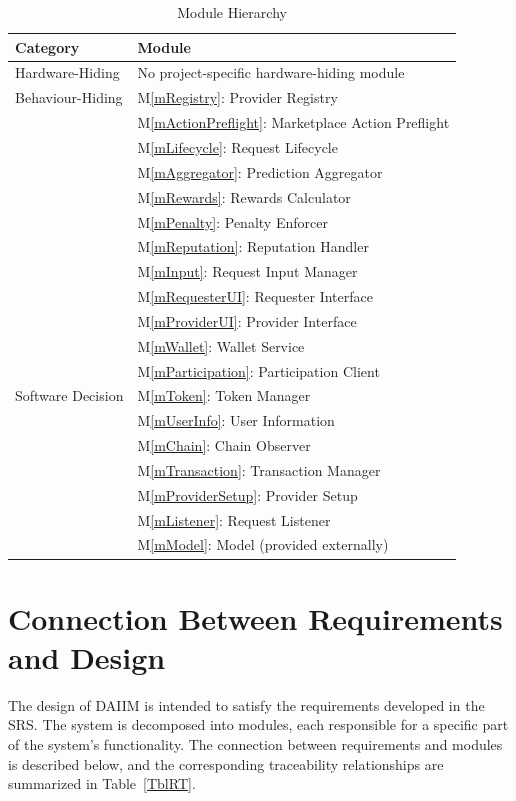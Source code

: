 \documentclass[12pt, titlepage]{article}
\newcommand{\mref}[1]{M\ref{#1}}
\begin{document}
\begin{table}[ht!]
\centering
\caption{Module Hierarchy}
\label{TblMH}
\small
\begin{tabularx}{\textwidth}{p{}X}
\toprule
\textbf{Category} & \textbf{Module}\\
\midrule
Hardware-Hiding & No project-specific hardware-hiding module \\
\midrule
Behaviour-Hiding & \mref{mRegistry}: Provider Registry \\
& \mref{mActionPreflight}: Marketplace Action Preflight \\
& \mref{mLifecycle}: Request Lifecycle \\
& \mref{mAggregator}: Prediction Aggregator \\
& \mref{mRewards}: Rewards Calculator \\
& \mref{mPenalty}: Penalty Enforcer \\
& \mref{mReputation}: Reputation Handler \\
& \mref{mInput}: Request Input Manager \\
& \mref{mRequesterUI}: Requester Interface \\
& \mref{mProviderUI}: Provider Interface \\
& \mref{mWallet}: Wallet Service \\
& \mref{mParticipation}: Participation Client \\
\midrule
Software Decision & \mref{mToken}: Token Manager \\
& \mref{mUserInfo}: User Information \\
& \mref{mChain}: Chain Observer \\
& \mref{mTransaction}: Transaction Manager \\
& \mref{mProviderSetup}: Provider Setup \\
& \mref{mListener}: Request Listener \\
& \mref{mModel}: Model (provided externally) \\
\bottomrule
\end{tabularx}
\end{table}

\section{Connection Between Requirements and Design} \label{SecConnection}

The design of DAIIM is intended to satisfy the requirements developed in
the SRS. The system is decomposed into modules, each responsible for a
specific part of the system's functionality. The connection between
requirements and modules is described below, and the corresponding
traceability relationships are summarized in Table~\ref{TblRT}.
\end{document}
